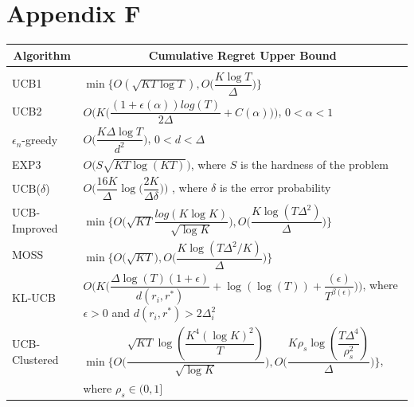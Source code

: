 \section{Appendix F}
\label{sample-table}
\begin{center}
\begin{tabular}{l|l}
\multicolumn{1}{c}{\bf Algorithm}  &\multicolumn{1}{c}{\bf Cumulative Regret Upper Bound} \\
\hline \\
UCB1         &\hspace*{5em}$\min\bigg\lbrace O(\sqrt{KT\log T}) ,O\bigg(\dfrac{K\log T}{\Delta}\bigg)\bigg\rbrace$ \\
UCB2         &\hspace*{5em}$O\bigg(K\bigg(\dfrac{(1 + \epsilon(\alpha)) log(T)}{2\Delta} + C(\alpha)\bigg)\bigg)$, $0<\alpha<1$ \\
$\epsilon_{n}$-greedy         &\hspace*{5em}$O\bigg(\dfrac{K\Delta\log T}{d^{2}}\bigg)$, $0<d<\Delta$ \\
EXP3             &\hspace*{5em}$O\bigg(S \sqrt{KT \log(KT)}\bigg)$, where $S$ is the hardness of the problem \\
UCB($\delta$)	&\hspace*{5em}$O\bigg(\dfrac{16K}{\Delta}\log\big(\dfrac{2K}{\Delta\delta}\big)\bigg)$ , where $\delta$ is the error probability\\
UCB-Improved             &\hspace*{5em}$\min\bigg\lbrace O\bigg(\sqrt{KT}\dfrac{log(K\log K)}{\sqrt{\log K}}\bigg), O\bigg(\dfrac{K\log (T\Delta^{2})}{\Delta}\bigg)\bigg\rbrace$ \\
MOSS				&\hspace*{5em}$\min\bigg\lbrace O\bigg(\sqrt{KT}\bigg), O\bigg(\dfrac{K\log(T\Delta^{2}/K)}{\Delta}\bigg) \bigg \rbrace$\\
KL-UCB         &\hspace*{5em}$O\bigg(K\bigg(\dfrac{\Delta \log(T)(1 + \epsilon)}{d(r_{i}, r^{*} )} + \log(\log(T)) + \dfrac{(\epsilon)}{T^{\beta(\epsilon)}}\bigg)\bigg)$, where $\epsilon > 0$ and $d(r_{i}, r^{*})>2\Delta_{i}^{2}$\\
UCB-Clustered             &\hspace*{5em}$\min\bigg\lbrace O\bigg(\dfrac{\sqrt{KT}\log{(\dfrac{K^{4}(\log K)^{2}}{T})}}{\sqrt{\log K}}\bigg),O\bigg(\dfrac{K\rho_{s}\log (\dfrac{T\Delta^{4}}{\rho_{s}^{2}})}{\Delta}\bigg)\bigg\rbrace$, \\& \hspace*{5em} where $\rho_{s}\in (0,1]$\\
\end{tabular}
\end{center}


